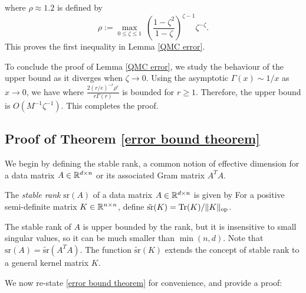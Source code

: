 where $\rho\approx 1.2$ is defined by 
$$\rho := \max_{0\leq \zeta\leq 1}~\left(\frac{1-\zeta^2}{1-\zeta}\right)^{\zeta-1} \zeta^{-\zeta}.$$
This proves the first inequality in Lemma \ref{QMC error}. 

To conclude the proof of Lemma \ref{QMC error}, we study the behaviour of the upper bound as it diverges when $\zeta\to 0$. Using the asymptotic $\Gamma(x)\sim 1/x$ as $x\to0$, we have
where $\frac{2(r/e)^{-r} \rho^r}{r\Gamma(r)}$ is bounded for $r\ge 1$. Therefore, the upper bound is $O(M^{-1}\zeta^{-1})$.
This completes the proof.

\subsection{Proof of Theorem \ref{error bound theorem}}
\label{apdx:proof-of-error-bound}

We begin by defining the stable rank, a common notion of effective dimension for a data matrix $A\in\mathbb{R}^{d\times n}$ or its associated Gram matrix $A^TA$.

\begin{definition}
The \emph{stable rank} $\text{sr}(A)$ of a data matrix $A\in\mathbb{R}^{d\times n}$ is given by
For a positive semi-definite matrix $K\in\mathbb{R}^{n\times n}$, define $\tilde{\text{sr}}(K) = \textnormal{Tr}(K)/\|K\|_\text{op}$.
\end{definition}

The stable rank of $A$ is upper bounded by the rank, but it is insensitive to small singular values, so it can be much smaller than $\min(n,d)$. Note that $\text{sr}(A) = \tilde{\text{sr}}(A^TA)$. The function $\tilde{\text{sr}}(K)$ extends the concept of stable rank to a general kernel matrix $K$. 

We now re-state \cref{error bound theorem} for convenience, and provide a proof:

